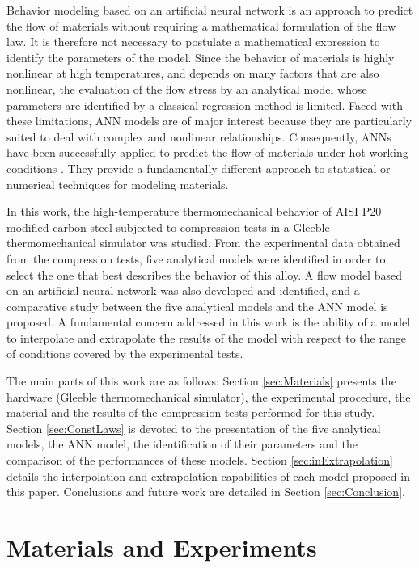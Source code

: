 \documentclass[twoside,english,1p,final,sort&compress]{elsarticle}
\theoremstyle{plain}
\begin{document}
Behavior modeling based on an artificial neural network is an approach to predict the flow of materials without requiring a mathematical formulation of the flow law. It is therefore not necessary to postulate a mathematical expression to identify the parameters of the model. Since the behavior of materials is highly nonlinear at high temperatures, and depends on many factors that are also nonlinear, the evaluation of the flow stress by an analytical model whose parameters are identified by a classical regression method is limited. Faced with these limitations, ANN models are of major interest because they are particularly suited to deal with complex and nonlinear relationships. Consequently, ANNs have been successfully applied to predict the flow of materials under hot working conditions \cite{Lin-2008-ANN, Lu-2011-ANN, Ashtiani-2016-CSP, Stoffel-2019-NNB, Pantale-2021}. They provide a fundamentally different approach to statistical or numerical techniques for modeling materials.

In this work, the high-temperature thermomechanical behavior of AISI P20 modified carbon steel subjected to compression tests in a Gleeble thermomechanical simulator was studied. From the experimental data obtained from the compression tests, five analytical models were identified in order to select the one that best describes the behavior of this alloy. A flow model based on an artificial neural network was also developed and identified, and a comparative study between the five analytical models and the ANN model is proposed. A fundamental concern addressed in this work is the ability of a model to interpolate and extrapolate the results of the model with respect to the range of conditions covered by the experimental tests.

The main parts of this work are as follows: Section \ref{sec:Materials} presents the hardware (Gleeble thermomechanical simulator), the experimental procedure, the material and the results of the compression tests performed for this study. Section \ref{sec:ConstLaws} is devoted to the presentation of the five analytical models, the ANN model, the identification of their parameters and the comparison of the performances of these models. Section \ref{sec:inExtrapolation} details the interpolation and extrapolation capabilities of each model proposed in this paper. Conclusions and future work are detailed in Section \ref{sec:Conclusion}.

\section{Materials and Experiments\label{sec:Materials}}
\end{document}
